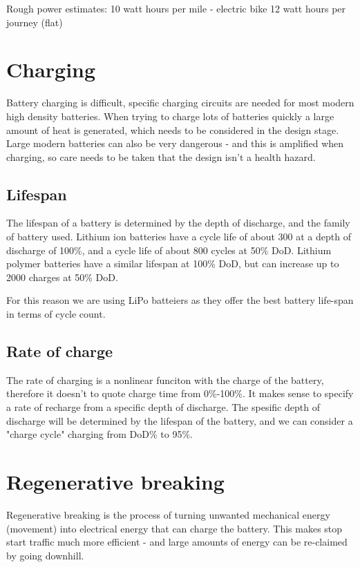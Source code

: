 \documentclass{article}
\begin{document}
Rough power estimates: 
10 watt hours per mile - electric bike
12 watt hours per journey (flat)

\section{Charging}
Battery charging is difficult, specific charging circuits are needed for most modern high density batteries.
When trying to charge lots of batteries quickly a large amount of heat is generated, which needs to be considered in the design stage.
Large modern batteries can also be very dangerous - and this is amplified when charging, so care needs to be taken that the design isn't a health hazard.
\subsection{Lifespan}
The lifespan of a battery is determined by the depth of discharge, and the family of battery used.
Lithium ion batteries have a cycle life of about 300 at a depth of discharge of 100\%, and a cycle life of about 800 cycles at 50\% DoD.
Lithium polymer batteries have a similar lifespan at 100\% DoD, but can increase up to 2000 charges at 50\% DoD.

For this reason we are using LiPo batteiers as they offer the best battery life-span in terms of cycle count.
\subsection{Rate of charge}
The rate of charging is a nonlinear funciton with the charge of the battery, therefore it doesn't to quote charge time from 0\%-100\%.
It makes sense to specify a rate of recharge from a specific depth of discharge.
The spesific depth of discharge will be determined by the lifespan of the battery, and we can consider a "charge cycle" charging from DoD\% to 95\%.

\section{Regenerative breaking}
Regenerative breaking is the process of turning unwanted mechanical energy (movement) into electrical energy that can charge the battery. 
This makes stop start traffic much more efficient - and large amounts of energy can be re-claimed by going downhill.
\end{document}
